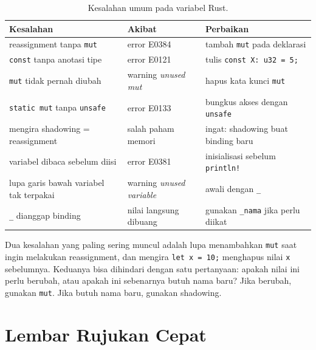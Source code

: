 \documentclass[11pt,a4paper]{article}
\begin{document}
\begin{table}[H]
	\centering
	\caption{Kesalahan umum pada variabel Rust.}
	\label{tab:mistakes}
	\scriptsize
	\setlength{\tabcolsep}{3pt}
	\renewcommand{\arraystretch}{1.2}
	\begin{tabularx}{\textwidth}{>{\raggedright\arraybackslash}p{5cm} >{\raggedright\arraybackslash}X >{\raggedright\arraybackslash}X}
		\toprule
		Kesalahan                                 & Akibat                           & Perbaikan                                 \\
		\midrule
		reassignment tanpa \texttt{mut}           & error E0384                      & tambah \texttt{mut} pada deklarasi        \\
		\texttt{const} tanpa anotasi tipe         & error E0121                      & tulis \texttt{const X: u32 = 5;}          \\
		\texttt{mut} tidak pernah diubah          & warning \textit{unused mut}      & hapus kata kunci \texttt{mut}             \\
		\texttt{static mut} tanpa \texttt{unsafe} & error E0133                      & bungkus akses dengan \texttt{unsafe}      \\
		mengira shadowing = reassignment          & salah paham memori               & ingat: shadowing buat binding baru        \\
		variabel dibaca sebelum diisi             & error E0381                      & inisialisasi sebelum \texttt{println!}    \\
		lupa garis bawah variabel tak terpakai    & warning \textit{unused variable} & awali dengan \texttt{\_}                  \\
		\texttt{\_} dianggap binding              & nilai langsung dibuang           & gunakan \texttt{\_nama} jika perlu diikat \\
		\bottomrule
	\end{tabularx}
\end{table}

Dua kesalahan yang paling sering muncul adalah lupa menambahkan \texttt{mut} saat ingin melakukan reassignment, dan mengira \texttt{let x = 10;} menghapus nilai \texttt{x} sebelumnya. Keduanya bisa dihindari dengan satu pertanyaan: apakah nilai ini perlu berubah, atau apakah ini sebenarnya butuh nama baru? Jika berubah, gunakan \texttt{mut}. Jika butuh nama baru, gunakan shadowing.

\section{Lembar Rujukan Cepat}
\end{document}
